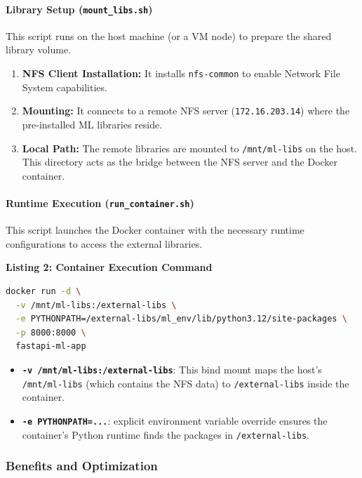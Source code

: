 \documentclass{ieeeaccess}
\begin{document}
\paragraph{Library Setup (\texttt{mount\_libs.sh})}
This script runs on the host machine (or a VM node) to prepare the shared library volume.
\begin{enumerate}
    \item \textbf{NFS Client Installation:} It installs \texttt{nfs-common} to enable Network File System capabilities.
    \item \textbf{Mounting:} It connects to a remote NFS server (\texttt{172.16.203.14}) where the pre-installed ML libraries reside.
    \item \textbf{Local Path:} The remote libraries are mounted to \texttt{/mnt/ml-libs} on the host. This directory acts as the bridge between the NFS server and the Docker container.
\end{enumerate}

\paragraph{Runtime Execution (\texttt{run\_container.sh})}
This script launches the Docker container with the necessary runtime configurations to access the external libraries.

\vspace{0.5em}
\noindent\textbf{Listing 2: Container Execution Command}
\label{lst:docker_run}
\vspace{0.3em}

\begin{lstlisting}[language=Bash]
docker run -d \
  -v /mnt/ml-libs:/external-libs \
  -e PYTHONPATH=/external-libs/ml_env/lib/python3.12/site-packages \
  -p 8000:8000 \
  fastapi-ml-app
\end{lstlisting}

\begin{itemize}
    \item \textbf{\texttt{-v /mnt/ml-libs:/external-libs}}: This bind mount maps the host's \texttt{/mnt/ml-libs} (which contains the NFS data) to \texttt{/external-libs} inside the container.
    \item \textbf{\texttt{-e PYTHONPATH=...}}: explicit environment variable override ensures the container's Python runtime finds the packages in \texttt{/external-libs}.
\end{itemize}

\subsubsection{Benefits and Optimization}
\end{document}
